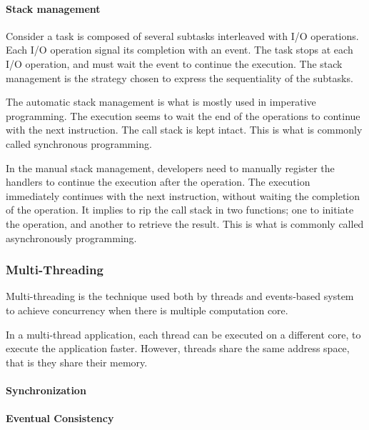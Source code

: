 \paragraph{Stack management}

Consider a task is composed of several subtasks interleaved with I/O operations.
Each I/O operation signal its completion with an event.
The task stops at each I/O operation, and must wait the event to continue the execution.
The stack management is the strategy chosen to express the sequentiality of the subtasks.

The automatic stack management is what is mostly used in imperative programming.
The execution seems to wait the end of the operations to continue with the next instruction.
The call stack is kept intact.
This is what is commonly called synchronous programming.

In the manual stack management, developers need to manually register the handlers to continue the execution after the operation.
The execution immediately continues with the next instruction, without waiting the completion of the operation.
It implies to rip the call stack in two functions; one to initiate the operation, and another to retrieve the result.
This is what is commonly called asynchronously programming.





\subsubsection{Multi-Threading}

Multi-threading is the technique used both by threads and events-based system to achieve concurrency when there is multiple computation core.



In a multi-thread application, each thread can be executed on a different core, to execute the application faster.
However, threads share the same address space, that is they share their memory.


\paragraph{Synchronization}



\paragraph{Eventual Consistency}

